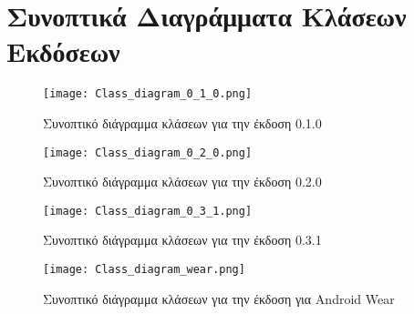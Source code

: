 \section{Συνοπτικά Διαγράμματα Κλάσεων Εκδόσεων}
	\label{ap:version_class_diag}
	\begin{figure}[h]
	\centering
		\texttt{[image: Class\_diagram\_0\_1\_0.png]}
	\caption{Συνοπτικό διάγραμμα κλάσεων για την έκδοση 0.1.0}
	\end{figure}

	\begin{figure}[p]
	\centering
		\texttt{[image: Class\_diagram\_0\_2\_0.png]}
	\caption{Συνοπτικό διάγραμμα κλάσεων για την έκδοση 0.2.0}
	\end{figure}

	\begin{figure}[p]
	\centering
		\texttt{[image: Class\_diagram\_0\_3\_1.png]}
	\caption{Συνοπτικό διάγραμμα κλάσεων για την έκδοση 0.3.1}
	\end{figure}

	\begin{figure}[p]
	\centering
		\texttt{[image: Class\_diagram\_wear.png]}
	\caption{Συνοπτικό διάγραμμα κλάσεων για την έκδοση για Android Wear}
	\end{figure}